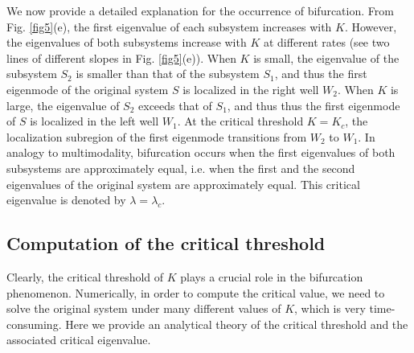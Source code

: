 \documentclass[a4paper,11pt]{article}
\begin{document}
We now provide a detailed explanation for the occurrence of bifurcation. From Fig. \ref{fig5}(e), the first eigenvalue of each subsystem increases with $K$. However, the eigenvalues of both subsystems increase with $K$ at different rates (see two lines of different slopes in Fig. \ref{fig5}(e)). When $K$ is small, the eigenvalue of the subsystem $S_2$ is smaller than that of the subsystem $S_1$, and thus the first eigenmode of the original system $S$ is localized in the right well $W_2$. When $K$ is large, the eigenvalue of $S_2$ exceeds that of $S_1$, and thus thus the first eigenmode of $S$ is localized in the left well $W_1$. At the critical threshold $K = K_c$, the localization subregion of the first eigenmode transitions from $W_2$ to $W_1$. In analogy to multimodality, bifurcation occurs when the first eigenvalues of both subsystems are approximately equal, i.e. when the first and the second eigenvalues of the original system are approximately equal. This critical eigenvalue is denoted by $\lambda = \lambda_c$.

\subsection{Computation of the critical threshold}
Clearly, the critical threshold of $K$ plays a crucial role in the bifurcation phenomenon. Numerically, in order to compute the critical value, we need to solve the original system under many different values of $K$, which is very time-consuming. Here we provide an analytical theory of the critical threshold and the associated critical eigenvalue.
\end{document}
